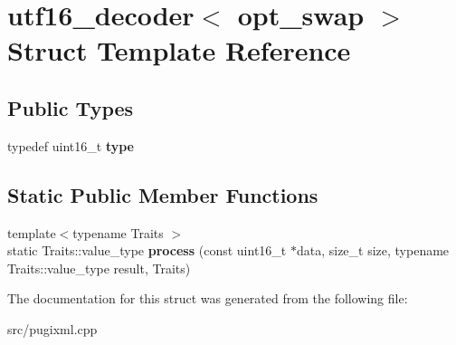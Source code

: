 \hypertarget{structutf16__decoder}{}\section{utf16\+\_\+decoder$<$ opt\+\_\+swap $>$ Struct Template Reference}
\label{structutf16__decoder}
\subsection*{Public Types}
\begin{DoxyCompactItemize}
\item 
\mbox{\label{structutf16__decoder_a6464d996125f65a0fc84d5fa5f11b878}} 
typedef uint16\+\_\+t {\bfseries type}
\end{DoxyCompactItemize}
\subsection*{Static Public Member Functions}
\begin{DoxyCompactItemize}
\item 
\mbox{\label{structutf16__decoder_a76791119a94c0105611212b8ee1ea86d}} 
{\footnotesize template$<$typename Traits $>$ }\\static Traits\+::value\+\_\+type {\bfseries process} (const uint16\+\_\+t $\ast$data, size\+\_\+t size, typename Traits\+::value\+\_\+type result, Traits)
\end{DoxyCompactItemize}


The documentation for this struct was generated from the following file\+:\begin{DoxyCompactItemize}
\item 
src/pugixml.\+cpp\end{DoxyCompactItemize}
